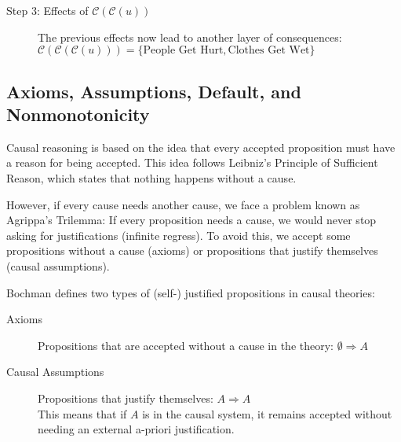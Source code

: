 \documentclass[seminar,palatino,english]{AIGpaper}
\newcommand{\ignore}[1]{}
\begin{document}
\begin{description}
\begin{description}
\begin{description}
            \item[Step 3: Effects of $ \mathcal{C}(\mathcal{C}(u)) $]  
            The previous effects now lead to another layer of consequences:  
            $
            \mathcal{C}(\mathcal{C}(\mathcal{C}(u))) = \{\text{People Get Hurt}, \text{Clothes Get Wet}\}
            $
        \end{description}
    \end{description}
\end{description}



\subsection{Axioms, Assumptions, Default, and Nonmonotonicity}

\ignore{
    \begin{itemize}
         \item Axiom: $\emptyset \Rightarrow A$.
        \item Assumption: $A \Rightarrow A$.
        \item Assumptions create models.
    \end{itemize}
}
Causal reasoning is based on the idea that every accepted proposition must have a reason for being accepted. This idea follows Leibniz’s Principle of Sufficient Reason, which states that nothing happens without a cause.

However, if every cause needs another cause, we face a problem known as Agrippa’s Trilemma: If every proposition needs a cause, we would never stop asking for justifications (infinite regress). To avoid this, we accept some propositions without a cause (axioms) or propositions that justify themselves (causal assumptions).

Bochman defines two types of (self-) justified propositions in causal theories:

\begin{description}
    \item[Axioms] Propositions that are accepted without a cause in the theory: $\emptyset \Rightarrow A$ 
    \item[Causal Assumptions] Propositions that justify themselves: $  A \Rightarrow A $ \\
    This means that if $A$ is in the causal system, it remains accepted without needing an external \glqq{}a-priori\grqq{} justification.
\end{description}
\end{document}
